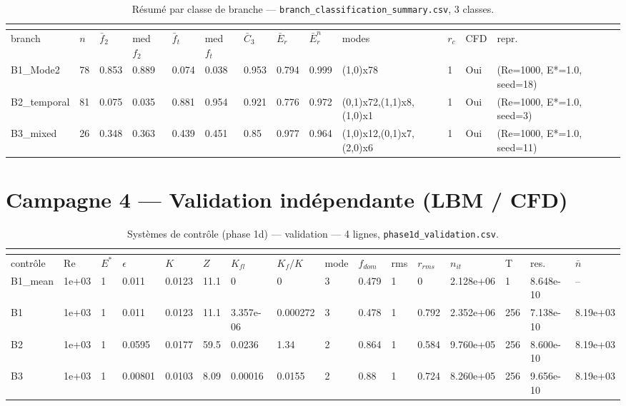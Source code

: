 \documentclass[11pt,a4paper]{article}
\begin{document}
\begin{landscape}
\begingroup\tiny
    \setlength{\tabcolsep}{1.2pt}
    \begin{longtable}{*{13}{l}}
    \caption{Résumé par classe de branche --- \texttt{branch\_classification\_summary.csv}, 3 classes.}\\
    \label{tab:classif}\\
    \toprule
    branch & $n$ & $\bar{f}_2$ & med $f_2$ & $\bar{f}_t$ & med $f_t$ & $\bar{C}_3$ & $\bar{E}_r$ & $\bar{E}_r^n$ & modes & $r_c$ & CFD & repr. \\
    \midrule
    \endhead
    \bottomrule
    \endlastfoot
    B1\_Mode2 & 78 & 0.853 & 0.889 & 0.074 & 0.038 & 0.953 & 0.794 & 0.999 & (1,0)x78 & 1 & Oui & (Re=1000, E*=1.0, seed=18) \\
    B2\_temporal & 81 & 0.075 & 0.035 & 0.881 & 0.954 & 0.921 & 0.776 & 0.972 & (0,1)x72,(1,1)x8,(1,0)x1 & 1 & Oui & (Re=1000, E*=1.0, seed=3) \\
    B3\_mixed & 26 & 0.348 & 0.363 & 0.439 & 0.451 & 0.85 & 0.977 & 0.964 & (1,0)x12,(0,1)x7,(2,0)x6 & 1 & Oui & (Re=1000, E*=1.0, seed=11) \\
    \end{longtable}
\endgroup
\end{landscape}


\section{Campagne 4 --- Validation indépendante (LBM / CFD)}

\begin{landscape}
\begingroup\tiny
    \setlength{\tabcolsep}{1.2pt}
    \begin{longtable}{*{16}{l}}
    \caption{Systèmes de contrôle (phase 1d) --- validation --- 4 lignes, \texttt{phase1d\_validation.csv}.}\\
    \label{tab:v1}\\
    \toprule
    contrôle & Re & $E^*$ & $\epsilon$ & $K$ & $Z$ & $K_{fl}$ & $K_f/K$ & mode & $f_{dom}$ & rms & $r_{rms}$ & $n_{it}$ & T & res. & $\bar{n}$ \\
    \midrule
    \endhead
    \bottomrule
    \endlastfoot
    B1\_mean & 1e+03 & 1 & 0.011 & 0.0123 & 11.1 & 0 & 0 & 3 & 0.479 & 1 & 0 & 2.128e+06 & 1 & 8.648e-10 & -- \\
    B1 & 1e+03 & 1 & 0.011 & 0.0123 & 11.1 & 3.357e-06 & 0.000272 & 3 & 0.478 & 1 & 0.792 & 2.352e+06 & 256 & 7.138e-10 & 8.19e+03 \\
    B2 & 1e+03 & 1 & 0.0595 & 0.0177 & 59.5 & 0.0236 & 1.34 & 2 & 0.864 & 1 & 0.584 & 9.760e+05 & 256 & 8.600e-10 & 8.19e+03 \\
    B3 & 1e+03 & 1 & 0.00801 & 0.0103 & 8.09 & 0.00016 & 0.0155 & 2 & 0.88 & 1 & 0.724 & 8.260e+05 & 256 & 9.656e-10 & 8.19e+03 \\
    \end{longtable}
\endgroup
\end{landscape}
\end{document}
